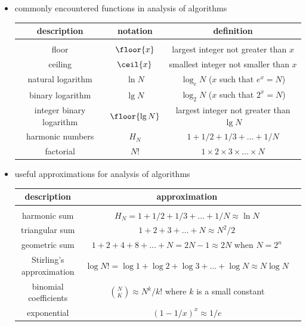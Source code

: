 \documentclass[8pt,a4paper,compress]{beamer}
\begin{document}
\begin{frame}[fragile]
\begin{itemize}
\item commonly encountered functions in analysis of algorithms
\begin{center}
\begin{tabular}{ccc}
\textbf{description} & \textbf{notation} & \textbf{definition} \\ \hline \\
floor & $\floor{x}$ & largest integer not greater than $x$ \\
ceiling & $\ceil{x}$ & smallest integer not smaller than $x$ \\
natural logarithm & $\ln N$ & $\log_eN$ ($x$ such that $e^x=N$) \\ 
binary logarithm & $\lg N$ & $\log_2N$ ($x$ such that $2^x=N$) \\
integer binary logarithm & $\floor{\lg N}$ & largest integer not greater than $\lg N$ \\
harmonic numbers & $H_N$ & $1+1/2+1/3+\dots+1/N$ \\
factorial & $N!$ & $1\times 2\times 3\times \dots \times N$
\end{tabular} 
\end{center}

\item useful approximations for analysis of algorithms
\begin{center}
\begin{tabular}{ccc}
\textbf{description} & \textbf{approximation} \\ \hline \\
harmonic sum & $H_N=1+1/2+1/3+\dots+1/N \approx \ln N$ \\
triangular sum & $1+2+3+\dots+N \approx N^2/2$ \\
geometric sum & $1+2+4+8+\dots+N=2N-1 \approx 2N$ when $N=2^n$ \\
Stirling's approximation & $\log N! = \log 1 +\log 2 + \log 3 + \dots + \log N \approx N\log N$ \\
binomial coefficients & $\binom{N}{K}\approx N^k/k!$ where $k$ is a small constant \\
exponential &  $(1-1/x)^x \approx 1/e$
\end{tabular} 
\end{center}
\end{itemize}
\end{frame}
\end{document}
